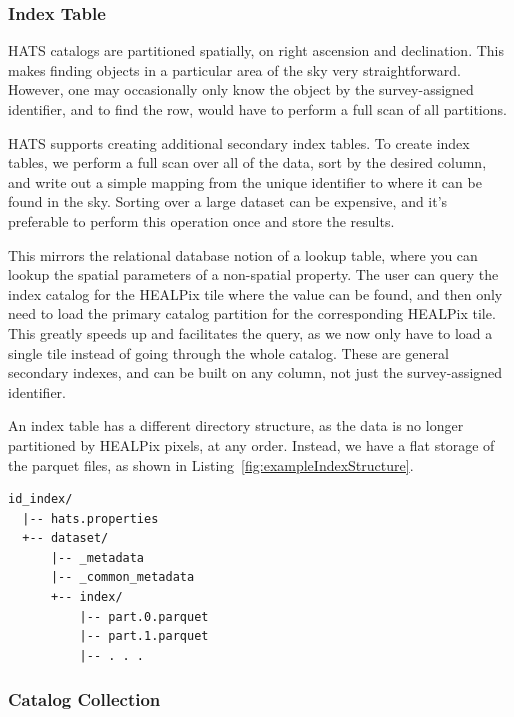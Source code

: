 \documentclass[11pt,a4paper]{ivoa}
\begin{document}
\subsubsection{Index Table} \label{sec:index}

HATS catalogs are partitioned spatially, on right ascension and declination. 
This makes finding objects in a particular area of the sky very straightforward. 
However, one may occasionally only know the object by the survey-assigned identifier, and to find the row, would have to perform a full scan of all partitions. \par

HATS supports creating additional secondary index tables. 
To create index tables, we perform a full scan over all of the data, sort by the desired column, and write out a simple mapping from the unique identifier to where it can be found in the sky.
Sorting over a large dataset can be expensive, and it's preferable to perform this operation once and store the results. \par

This mirrors the relational database notion of a lookup table, where you can lookup the spatial parameters of a non-spatial property.
The user can query the index catalog for the HEALPix tile where the value can be found, and then only need to load the primary catalog partition for the corresponding HEALPix tile. 
This greatly speeds up and facilitates the query, as we now only have to load a single tile instead of going through the whole catalog.
These are general secondary indexes, and can be built on any column, not just the survey-assigned identifier. \par

An index table has a different directory structure, as the data is no longer partitioned by HEALPix pixels, at any order.
Instead, we have a flat storage of the parquet files, as shown in Listing~\ref{fig:exampleIndexStructure}.

\begin{minipage}{\linewidth}
  \begin{lstlisting}[caption=Example index table directory contents, label=fig:exampleIndexStructure]
  id_index/
  |-- hats.properties
  +-- dataset/
      |-- _metadata
      |-- _common_metadata
      +-- index/
          |-- part.0.parquet
          |-- part.1.parquet
          |-- . . .
  \end{lstlisting}
\end{minipage}
  
\subsubsection{Catalog Collection} \label{sec:collection}
\end{document}
